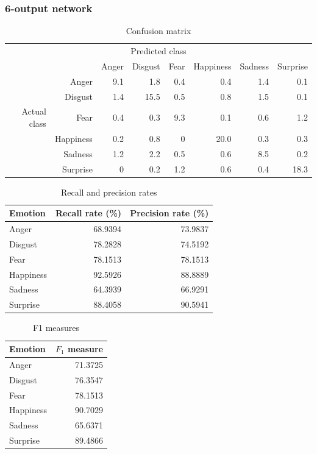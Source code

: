 \documentclass[12pt]{article}
\begin{document}
\subsubsection*{6-output network}

\begin{table}
\centering
\begin{tabular}{r r | r r r r r r}
\multicolumn{8}{c}{Predicted class} \\
&  & Anger & Disgust & Fear & Happiness & Sadness & Surprise \\
\hline
 & Anger            & 9.1 & 1.8  & 0.4 & 0.4  & 1.4 & 0.1  \\
 & Disgust          & 1.4 & 15.5 & 0.5 & 0.8  & 1.5 & 0.1  \\
Actual class & Fear & 0.4 & 0.3  & 9.3 & 0.1  & 0.6 & 1.2  \\
 & Happiness        & 0.2 & 0.8  & 0   & 20.0 & 0.3 & 0.3  \\
 & Sadness          & 1.2 & 2.2  & 0.5 & 0.6  & 8.5 & 0.2  \\
 & Surprise         & 0   & 0.2  & 1.2 & 0.6  & 0.4 & 18.3 \\
\end{tabular}
\caption{Confusion matrix}
\end{table}

\begin{table}
\centering
\begin{tabular}{l | r r}
Emotion & Recall rate (\%) & Precision rate (\%) \\
\hline
Anger     & 68.9394 & 73.9837 \\
Disgust   & 78.2828 & 74.5192 \\
Fear      & 78.1513 & 78.1513 \\
Happiness & 92.5926 & 88.8889 \\
Sadness   & 64.3939 & 66.9291 \\
Surprise  & 88.4058 & 90.5941 \\
\end{tabular}
\caption{Recall and precision rates}
\end{table}

\begin{table}
\centering
\begin{tabular}{l | r}
Emotion & \( F_1 \) measure \\
\hline
Anger     & 71.3725 \\
Disgust   & 76.3547 \\
Fear      & 78.1513 \\
Happiness & 90.7029 \\
Sadness   & 65.6371 \\
Surprise  & 89.4866 \\
\end{tabular}
\caption{F1 measures}
\end{table}
\end{document}

